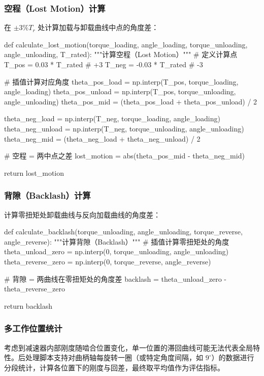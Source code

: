 \documentclass[12pt]{ctexart}
\begin{document}
\subsubsection{空程（Lost Motion）计算}
在 $\pm 3\% T_r$ 处计算加载与卸载曲线中点的角度差：

\begin{pythoncode}[空程计算算法]
def calculate_lost_motion(torque_loading, angle_loading,
                         torque_unloading, angle_unloading, T_rated):
    """计算空程（Lost Motion）"""
    # 定义计算点
    T_pos = 0.03 * T_rated  # +3%
    T_neg = -0.03 * T_rated  # -3%

    # 插值计算对应角度
    theta_pos_load = np.interp(T_pos, torque_loading, angle_loading)
    theta_pos_unload = np.interp(T_pos, torque_unloading, angle_unloading)
    theta_pos_mid = (theta_pos_load + theta_pos_unload) / 2

    theta_neg_load = np.interp(T_neg, torque_loading, angle_loading)
    theta_neg_unload = np.interp(T_neg, torque_unloading, angle_unloading)
    theta_neg_mid = (theta_neg_load + theta_neg_unload) / 2

    # 空程 = 两中点之差
    lost_motion = abs(theta_pos_mid - theta_neg_mid)

    return lost_motion
\end{pythoncode}

\subsubsection{背隙（Backlash）计算}
计算零扭矩处卸载曲线与反向加载曲线的角度差：

\begin{pythoncode}[背隙计算算法]
def calculate_backlash(torque_unloading, angle_unloading,
                      torque_reverse, angle_reverse):
    """计算背隙（Backlash）"""
    # 插值计算零扭矩处的角度
    theta_unload_zero = np.interp(0, torque_unloading, angle_unloading)
    theta_reverse_zero = np.interp(0, torque_reverse, angle_reverse)

    # 背隙 = 两曲线在零扭矩处的角度差
    backlash = theta_unload_zero - theta_reverse_zero

    return backlash
\end{pythoncode}

\subsubsection{多工作位置统计}
考虑到减速器内部刚度随啮合位置变化，单一位置的滞回曲线可能无法代表全局特性。后处理脚本支持对曲柄轴每旋转一圈（或特定角度间隔，如 $9^\circ$）的数据进行分段统计，计算各位置下的刚度与回差，最终取平均值作为评估指标。
\end{document}
